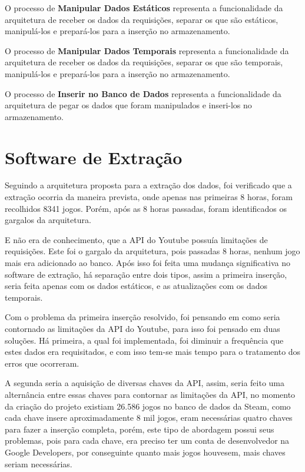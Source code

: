 O processo de \textbf{Manipular Dados Estáticos} representa a funcionalidade da arquitetura de receber os dados da requisições, separar os que são estáticos, manipulá-los e prepará-los para a inserção no armazenamento.

O processo de \textbf{Manipular Dados Temporais} representa a funcionalidade da arquitetura de receber os dados da requisições, separar os que são temporais, manipulá-los e prepará-los para a inserção no armazenamento.

O processo de \textbf{Inserir no Banco de Dados} representa a funcionalidade da arquitetura de pegar os dados que foram manipulados e inseri-los no armazenamento.

\section{Software de Extração}
Seguindo a arquitetura proposta para a extração dos dados, foi verificado que a extração ocorria da maneira prevista, onde apenas nas primeiras 8 horas, foram recolhidos 8341 jogos. Porém, após as 8 horas passadas, foram identificados os gargalos da arquitetura. 

E não era de conhecimento, que a API do Youtube possuía limitações de requisições. Este foi o gargalo da arquitetura, pois passadas 8 horas, nenhum jogo mais era adicionado ao banco. Após isso foi feita uma mudança significativa no software de extração, há separação entre dois tipos, assim a primeira inserção, seria feita apenas com os dados estáticos, e as atualizações com os dados temporais.

Com o problema da primeira inserção resolvido, foi pensando em como seria contornado as limitações da API do Youtube, para isso foi pensado em duas soluções. Há primeira, a qual foi implementada, foi diminuir a frequência que estes dados era requisitados, e com isso tem-se mais tempo para o tratamento dos erros que ocorreram. 

A segunda seria a aquisição de diversas chaves da API, assim, seria feito uma alternância entre essas chaves para contornar as limitações da API, no momento da criação do projeto existiam 26.586 jogos no banco de dados da Steam, como cada chave insere aproximadamente 8 mil jogos, eram necessárias quatro chaves para fazer a inserção completa, porém, este tipo de abordagem possui seus problemas, pois para cada chave, era preciso ter um conta de desenvolvedor na Google Developers, por conseguinte quanto mais jogos houvesem, mais chaves seriam necessárias.

